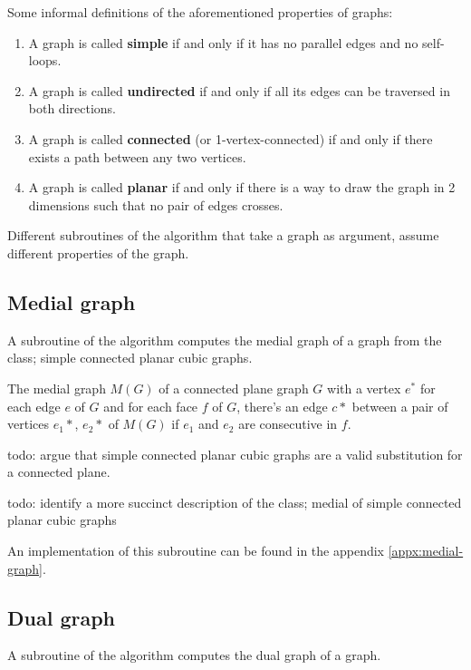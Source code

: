 \documentclass{article}
\begin{document}
	Some informal definitions of the aforementioned properties of graphs:

	\begin{enumerate}
		\item A graph is called \textbf{simple} if and only if it has no parallel edges and no self-loops.
		\item A graph is called \textbf{undirected} if and only if all its edges can be traversed in both directions.
		\item A graph is called \textbf{connected} (or 1-vertex-connected) if and only if there exists a path between any two vertices.
		\item A graph is called \textbf{planar} if and only if there is a way to draw the graph in 2 dimensions such that no pair of edges crosses.
	\end{enumerate}

	Different subroutines of the algorithm that take a graph as argument, assume different properties of the graph.

	\subsection{Medial graph}
		
		A subroutine of the algorithm computes the medial graph of a graph from the class; simple connected planar cubic graphs.
		
		\begin{definition}
			The medial graph $M(G)$ of a connected plane graph $G$ with a vertex $e^*$ for each edge $e$ of $G$ and for each face $f$ of $G$, there's an edge $c*$ between a pair of vertices $e_1*$, $e_2*$ of $M(G)$ if $e_1$ and $e_2$ are consecutive in $f$.
		\end{definition}
		
		todo: argue that simple connected planar cubic graphs are a valid substitution for a connected plane.
		
		todo: identify a more succinct description of the class; medial of simple connected planar cubic graphs

		An implementation of this subroutine can be found in the appendix \ref{appx:medial-graph}.

	
	\subsection{Dual graph}
	
		A subroutine of the algorithm computes the dual graph of a graph.
		
\end{document}
